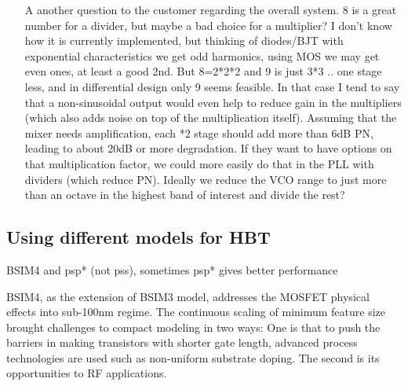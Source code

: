 
\begin{itemize}

	\item [A] another question to the customer regarding the overall system. 8 is a great number for a divider, but maybe a bad choice for a multiplier? I don't know how it is currently implemented, but thinking of diodes/BJT with exponential characteristics we get odd harmonics, using MOS we may get even ones, at least a good 2nd. But 8=2*2*2 and 9 is just 3*3 .. one stage less, and in differential design only 9 seems feasible. In that case I tend to say that a non-sinusoidal output would even help to reduce gain in the multipliers (which also adds noise on top of the multiplication itself). Assuming that the mixer needs amplification, each *2 stage should add more than 6dB PN, leading to about 20dB or more degradation. If they want to have options on that multiplication factor, we could more easily do that in the PLL with dividers (which reduce PN). Ideally we reduce the VCO range to just more than an octave in the highest band of interest and divide the rest?
 
\end{itemize}







\subsection{Using different models for HBT}

BSIM4 and psp* (not pss), sometimes psp* gives better performance

BSIM4, as the extension of BSIM3 model, addresses the MOSFET physical effects into sub-100nm regime. The continuous scaling of minimum feature size brought challenges to compact modeling in two ways: One is that to push the barriers in making transistors with shorter gate length, advanced process technologies are used such as non-uniform substrate doping. The second is its opportunities to RF applications.


